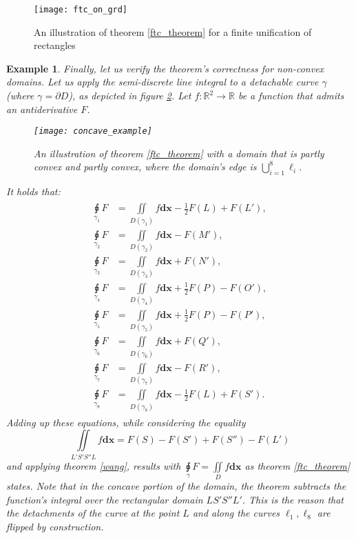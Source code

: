 \documentclass[11pt]{book}
\newtheorem{exm}[thm]{Example}
\begin{document}
\begin{figure}
\texttt{[image: ftc\_on\_grd]}
\caption{An illustration of theorem \ref{ftc_theorem} for a finite unification of rectangles}
\label{ftc_on_grd}
\end{figure}

\begin{exm}Finally, let us verify the theorem's correctness for non-convex domains. Let us apply the semi-discrete line integral to a detachable
curve $\gamma$ (where $\gamma=\partial D$), as depicted in figure
\ref{concave_example}. Let $f:\mathbb{R}^{2}\rightarrow\mathbb{R}$ be a function that
admits an antiderivative $F$.

\begin{figure}
\texttt{[image: concave\_example]}
\caption{An illustration of theorem \ref{ftc_theorem} with a domain that is partly convex and partly convex, where the domain’s edge is $\bigcup_{i=1}^{8}\ell_{i}$.}
\label{concave_example}
\end{figure}

It holds that:
\begin{align}
\begin{aligned}
\underset{\gamma_{1}}{\sqint}F & =\underset{D\left(\gamma_{1}\right)}{\iint}f\boldsymbol{dx}-\frac{1}{2}F\left(L\right)+F\left(L'\right),\\
\underset{\gamma_{2}}{\sqint}F & =\underset{D\left(\gamma_{2}\right)}{\iint}f\boldsymbol{dx}-F\left(M'\right),\\
\underset{\gamma_{3}}{\sqint}F & =\underset{D\left(\gamma_{3}\right)}{\iint}f\boldsymbol{dx}+F\left(N'\right),\\
\underset{\gamma_{4}}{\sqint}F & =\underset{D\left(\gamma_{4}\right)}{\iint}f\boldsymbol{dx}+\frac{1}{2}F\left(P\right)-F\left(O'\right),\\
\underset{\gamma_{5}}{\sqint}F & =\underset{D\left(\gamma_{5}\right)}{\iint}f\boldsymbol{dx}+\frac{1}{2}F\left(P\right)-F\left(P'\right),\\
\underset{\gamma_{6}}{\sqint}F & =\underset{D\left(\gamma_{6}\right)}{\iint}f\boldsymbol{dx}+F\left(Q'\right),\\
\underset{\gamma_{7}}{\sqint}F & =\underset{D\left(\gamma_{7}\right)}{\iint}f\boldsymbol{dx}-F\left(R'\right),\\
\underset{\gamma_{8}}{\sqint}F & =\underset{D\left(\gamma_{8}\right)}{\iint}f\boldsymbol{dx}-\frac{1}{2}F\left(L\right)+F\left(S'\right).
\end{aligned}
\end{align}
Adding up these equations, while considering the equality
\[
\underset{L'S'S''L}{\iint}f\boldsymbol{dx}=F\left(S\right)-F\left(S'\right)+F\left(S''\right)-F\left(L'\right)
\]
and applying theorem \ref{wang}, results with $\underset{\gamma}{\sqint}F=\underset{D}{\iint}f\boldsymbol{dx}$
as theorem \ref{ftc_theorem} states. Note that in the concave portion of the domain, the theorem subtracts the function's integral over the rectangular domain $LS'S''L'$. This is the reason that the detachments of the curve at the point $L$ and along the curves $\ell_1,\ell_8$ are flipped by construction.
\end{exm}
\end{document}

